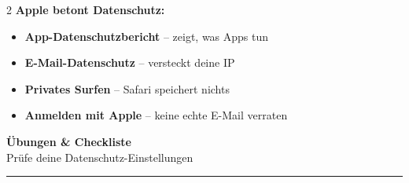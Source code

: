 \documentclass[a4paper,landscape,8pt]{extarticle}
\begin{document}
\begin{multicols}{2}
\textbf{Apple betont Datenschutz:}
\begin{itemize}
\item \textbf{App-Datenschutzbericht} -- zeigt, was Apps tun
\item \textbf{E-Mail-Datenschutz} -- versteckt deine IP
\item \textbf{Privates Surfen} -- Safari speichert nichts
\item \textbf{Anmelden mit Apple} -- keine echte E-Mail verraten
\end{itemize}

\vspace{2mm}

\begin{center}
\end{center}

\end{multicols}

\newpage


\begin{center}
{\LARGE\bfseries Übungen \& Checkliste}\\[3pt]
{\normalsize Prüfe deine Datenschutz-Einstellungen}
\end{center}

\vspace{1mm}
\hrule
\vspace{2mm}
\end{document}
